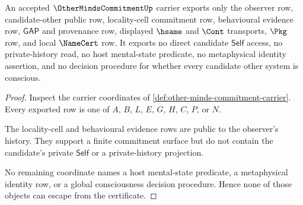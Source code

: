 \begin{theorem}
\label{thm:other-minds-commitment-non-escape-boundary}
An accepted $\OtherMindsCommitmentUp$ carrier exports only the observer row, candidate-other public row, locality-cell commitment row, behavioural evidence row, $\mathsf{GAP}$ and provenance row, displayed $\hsame$ and $\Cont$ transports, $\Pkg$ row, and local $\NameCert$ row. It exports no direct candidate $\mathsf{Self}$ access, no private-history read, no host mental-state predicate, no metaphysical identity assertion, and no decision procedure for whether every candidate other system is conscious.
\end{theorem}
\begin{proof}
Inspect the carrier coordinates of \autoref{def:other-minds-commitment-carrier}. Every exported row is one of $A$, $B$, $L$, $E$, $G$, $H$, $C$, $P$, or $N$.

The locality-cell and behavioural evidence rows are public to the observer's history. They support a finite commitment surface but do not contain the candidate's private $\mathsf{Self}$ or a private-history projection.

No remaining coordinate names a host mental-state predicate, a metaphysical identity row, or a global consciousness decision procedure. Hence none of those objects can escape from the certificate.
\end{proof}

